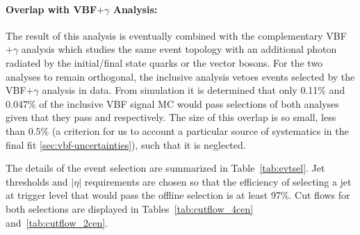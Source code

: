 
\paragraph{Overlap with VBF$+\gamma$ Analysis:} The result of this analysis is eventually combined with the complementary VBF$+\gamma$ analysis which studies the same event topology with an additional photon radiated by the initial/final state quarks or the vector bosons. For the two analyses to remain orthogonal, the inclusive analysis vetoes events selected by the VBF$+\gamma$ analysis in data. From simulation it is determined that only 0.11\% and 0.047\% of the inclusive VBF signal MC would pass selections of both analyses given that they pass \twocentral and \fourcentral respectively. The size of this overlap is so small, less than $0.5\%$ (a criterion for us to account a particular source of systematics in the final fit \ref{sec:vbf-uncertainties}), such that it is neglected.  



The details of the event selection are summarized in Table~\ref{tab:evtsel}. 
Jet \pT thresholds and $|\eta|$ requirements are chosen so that the efficiency of selecting a jet at trigger level that would pass the offline selection is at least 97\%. Cut flows for both selections are displayed in Tables~\ref{tab:cutflow_4cen} and~\ref{tab:cutflow_2cen}.


